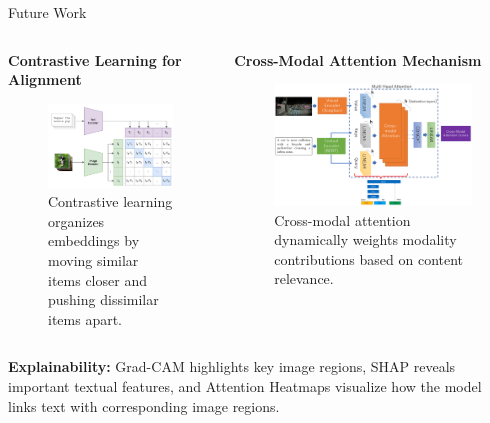 \documentclass[xcolor=dvipsnames,aspectratio=169]{beamer}
\begin{document}
\begin{frame}{Future Work}
\vspace{-0.3cm}
\begin{columns}[T]
    \begin{column}{0.29\textwidth}
        \textbf{Contrastive Learning for Alignment}
        \begin{figure}
            \centering
            \includegraphics[width=\textwidth]{contrastive_learning.png}
            \caption{Contrastive learning organizes embeddings by moving similar items closer and pushing dissimilar items apart.}
            \label{fig:contrastive_learning}
        \end{figure}
    \end{column}
    \hfill
    \begin{column}{0.41\textwidth}
        \textbf{Cross-Modal Attention Mechanism}
        \begin{figure}
            \centering
            \includegraphics[width=\textwidth]{cross-attention.png}
            \caption{Cross-modal attention dynamically weights modality contributions based on content relevance.}
            \label{fig:cross_attention}
        \end{figure}
    \end{column}
\end{columns}

\vspace{0.3cm}
\small
\textbf{Explainability:} Grad-CAM highlights key image regions, SHAP reveals important textual features, and Attention Heatmaps visualize how the model links text with corresponding image regions.
\end{frame}
\end{document}
